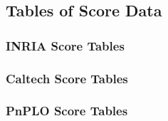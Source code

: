 \subsection{Tables of Score Data}\label{appendix:tables_of_data}
\newpage
\subsubsection{INRIA Score Tables}

\subsubsection{Caltech Score Tables}

\subsubsection{PnPLO Score Tables}

